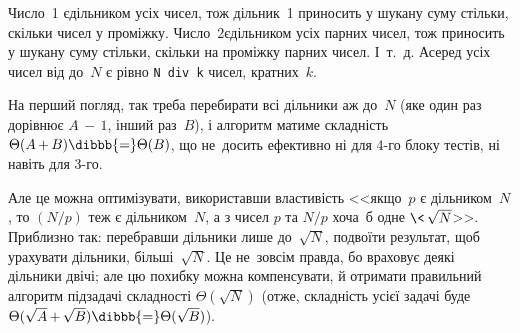 



Число~1 є\nolinebreak[3] дільником усіх чисел, тож дільник~1 приносить у шукану суму стільки, скільки чисел у проміжку. Число~2\nolinebreak[3] є\nolinebreak[3] дільником усіх парних чисел, тож приносить у шукану суму стільки, скільки на проміжку парних чисел. І~т.~д. А\nolinebreak[3] серед усіх чисел від до~$N$ є рівно \verb"N div k" чисел, кратних~$k$.\label{text:sum-num-divs-end-of-theta-b-algorithm}

На перший погляд, так треба перебирати всі дільники аж до~$N$ (яке один раз дорівнює $A\,{-}\,1$, інший раз~$B$), 
і алгоритм матиме складність ${\Theta(A\,{+}\,B)}\dibbb{{=}}\Theta(B)$, що не~досить ефективно ні для \mbox{4-го} блоку тестів, ні навіть для \mbox{3-го}.

Але це можна оптимізувати, 
використавши 
властивість
<<якщо~$p$ є дільником~$N$, то ${(N/p)}$ теж є дільником~$N$, а з чисел $p$ та $N/p$ хоча~б одне${\,\,{\<}\,\sqrt{N}}$>>.
Приблизно так: перебравши дільники лише до~$\sqrt{N}$, подвоїти результат, щоб урахувати дільники, більші~$\sqrt{N}$.
Це не~зовсім правда, бо враховує деякі дільники двічі;
але цю похибку можна компенсувати, й отримати правильний алгоритм підзадачі складності $\Theta(\sqrt{N})$ (отже, складність усієї задачі буде ${\Theta(\sqrt{A}\,{+}\,\sqrt{B})}\dibbb{{=}}\Theta(\sqrt{B})$).

